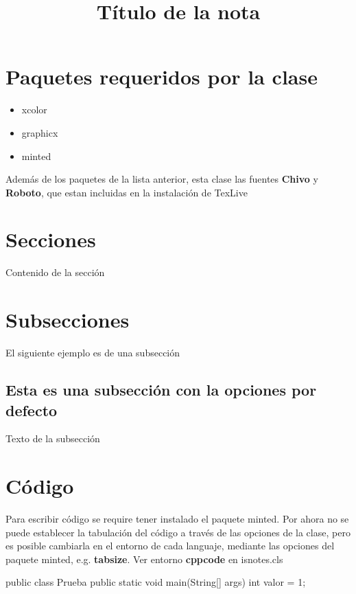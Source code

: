 \documentclass{isnotes}
\title{Título de la nota}
\begin{document}
\maketitle

\section{Paquetes requeridos por la clase}
\begin{itemize}
	\item xcolor
	\item graphicx
	\item minted
\end{itemize}

Además de los paquetes de la lista anterior, esta clase las fuentes \textbf{Chivo} y \textbf{Roboto}, que estan incluidas en la instalación de TexLive

\section{Secciones}
Contenido de la sección

\section{Subsecciones}

El siguiente ejemplo es de una subsección

\subsection{Esta es una subsección con la opciones por defecto}

Texto de la subsección

\section{Código}
Para escribir código se require tener instalado el paquete minted. Por ahora no se puede establecer la tabulación del código a través de las opciones de la clase, pero es posible cambiarla en el entorno de cada languaje, mediante las opciones del paquete minted, e.g. \textbf{tabsize}. Ver entorno \textbf{cppcode} en isnotes.cls

\begin{listing}[ht!]
\begin{javacode}
public class Prueba {
	public static void main(String[] args) {
		int valor = 1;
	}
}
\end{javacode}
\end{listing}
\end{document}
